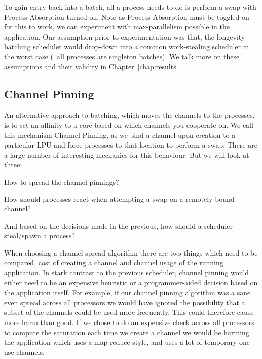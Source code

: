 To gain entry back into a batch, all a process needs to do is perform a swap 
with Process Absorption turned on. Note as Process Absorption must be toggled
on for this to work, we can experiment with max-parallelism possible in the 
application. Our assumption prior to experimentation was that, the 
longevity-batching scheduler would drop-down into a common work-stealing
scheduler in the worst case (\ie~all processes are singleton batches). We talk 
more on these assumptions and their validity in Chapter~\ref{chap:results}.


\subsection{Channel Pinning}\label{sec:channel pinning}

An alternative approach to batching, which moves the channels to the processes,
is to set an affinity to a core based on which channels you cooperate on. We 
call this mechanism Channel Pinning, as we bind a channel upon creation to a
particular LPU and force processes to that location to perform a swap. 
There are a large number of interesting mechanics for this behaviour. But we 
will look at three: 
\begin{inparaenum}
\item How to spread the channel pinnings?
\item How should processes react when attempting a swap on a remotely bound channel?
\item And based on the decisions made in the previous, how should a scheduler steal/spawn a process?
\end{inparaenum}

When choosing a channel spread algorithm there are two things which need to be
compared, cost of creating a channel and channel usage of the running application. 
In stark contrast to the previous scheduler, channel
pinning would either need to be an expensive heuristic or a programmer-aided
decision based on the application itself.
For example, if our channel pinning algorithm was a sane even spread across all
processors we would have ignored the possibility that a subset of the channels
could be used more frequently. This could therefore cause more harm than good.
If we chose to do an expensive check across all processors to compute the 
saturation each time we create a channel we would be harming the application 
which uses a map-reduce style, and uses a lot of temporary one-use channels.

